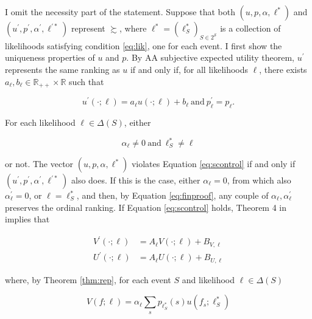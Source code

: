 \begin{corproof} I omit the necessity part of the statement. Suppose that both \( \left( u, p, \alpha, \ell^{*} \right) \) and \( \left( u^{\prime}, p^{\prime}, \alpha^{\prime}, \ell^{\prime *} \right) \) represent \( \succsim \), where \( \ell^{*} = \left( \ell^{*}_{S} \right)_{S \in 2^{\mathcal{S}}} \) is a collection of likelihoods satisfying condition \eqref{eq:lik}, one for each event. I first show the uniqueness properties of \( u \) and \( p \). By AA subjective expected utility theorem, \( u^{\prime} \) represents the same ranking as \( u \) if and only if, for all likelihoods \( \ell \), there exists \( a_{\ell}, b_{\ell} \in \mathbb{R}_{++} \times \mathbb{R} \) such that

	\begin{equation}\label{eq:uniqcor}
		u^{\prime} \left( \cdot ; \ell \right) = a_{\ell} u \left( \cdot ; \ell \right) + b_{\ell} \: \text{and} \: p^{\prime}_{\ell} = p_{\ell} .
	\end{equation}

	For each likelihood \( \ell \in \Delta \left( S \right) \), either

	\begin{equation}\label{eq:scontrol}
		\alpha_{\ell} \neq 0 \: \text{and} \: \ell^{*}_S \neq \ell
	\end{equation}

	or not. The vector \( \left( u, p, \alpha, \ell^{*} \right) \) violates Equation \eqref{eq:scontrol} if and only if \( \left( u^{\prime}, p^{\prime}, \alpha^{\prime}, \ell^{\prime *} \right) \) also does. If this is the case, either \( \alpha_{\ell} = 0 \), from which also \( \alpha^{\prime}_{\ell} = 0 \), or \( \ell = \ell^{*}_{S} \), and then, by Equation \eqref{eq:finproof}, any couple of \( \alpha_{\ell}, \alpha^{\prime}_{\ell} \) preserves the ordinal ranking. If Equation \eqref{eq:scontrol} holds, Theorem 4 in \cite{gulTemptationSelfControl2001} implies that

	\begin{align}\label{eq:uniqcor2}
		V^{\prime} \left( \cdot ; \ell \right) & = A_{\ell} V \left( \cdot ; \ell \right) + B_{V,\ell} \\
		U^{\prime} \left( \cdot ; \ell \right) & = A_{\ell} U \left( \cdot ; \ell \right) + B_{U,\ell}
	\end{align}

	where, by Theorem \ref{thm:rep}, for each event \( S \) and likelihood \( \ell \in \Delta \left( S \right) \)

	\[
		V \left( f ; \ell \right) = \alpha_{\ell} \sum_{s} p_{\ell^{*}_{S}} \left( s \right) u \left( f_{s} ; \ell^{*}_{S} \right)
	\]


\end{corproof}
